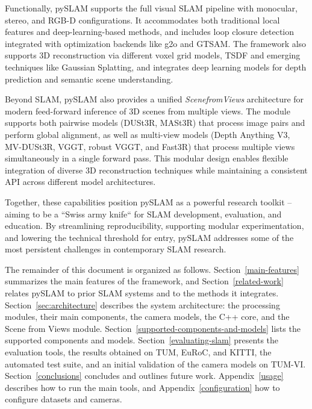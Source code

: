 \documentclass{article}
\begin{document}
Functionally, pySLAM supports the full visual SLAM pipeline with monocular, stereo, and RGB-D configurations. It accommodates both traditional local features and deep-learning-based methods, and includes loop closure detection integrated with optimization backends like g2o\cite{g2o_kummerle} and GTSAM\cite{factor_graphs_for_robot_perception}. The framework also supports 3D reconstruction via different voxel grid models, TSDF\cite{dong2022ash} and emerging techniques like Gaussian Splatting\cite{bao20253d}, and integrates deep learning models for depth prediction and semantic scene understanding.

Beyond SLAM, pySLAM also provides a unified \textit{ScenefromViews} architecture for modern feed-forward inference of 3D scenes from multiple views. The module supports both pairwise models (DUSt3R\cite{wang2023dust3r}, MASt3R\cite{leroy2024grounding}) that process image pairs and perform global alignment, as well as multi-view models (Depth Anything V3\cite{depthanything3}, MV-DUSt3R\cite{tang2025mv}, VGGT\cite{wang2025vggt}, robust VGGT\cite{vggt_robust}, and Fast3R\cite{yang2025fast3r}) that process multiple views simultaneously in a single forward pass. This modular design enables flexible integration of diverse 3D reconstruction techniques while maintaining a consistent API across different model architectures.

Together, these capabilities position pySLAM as a powerful research toolkit -- aiming to be a ``Swiss army knife`` for SLAM development, evaluation, and education. By streamlining reproducibility, supporting modular experimentation, and lowering the technical threshold for entry, pySLAM addresses some of the most persistent challenges in contemporary SLAM research.

The remainder of this document is organized as follows. Section~\ref{main-features} summarizes the main features of the framework, and Section~\ref{related-work} relates pySLAM to prior SLAM systems and to the methods it integrates. Section~\ref{sec:architecture} describes the system architecture: the processing modules, their main components, the camera models, the C++ core, and the Scene from Views module. Section~\ref{supported-components-and-models} lists the supported components and models. Section~\ref{evaluating-slam} presents the evaluation tools, the results obtained on TUM, EuRoC, and KITTI, the automated test suite, and an initial validation of the camera models on TUM-VI. Section~\ref{conclusions} concludes and outlines future work. Appendix~\ref{usage} describes how to run the main tools, and Appendix~\ref{configuration} how to configure datasets and cameras.
\end{document}
